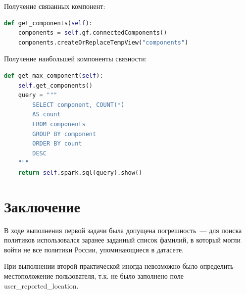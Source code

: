 Получение связанных компонент:

\begin{lstlisting}[language={Python}, caption={Получение связанных компонент}, label=lst:gf2]
def get_components(self):
	components = self.gf.connectedComponents()
	components.createOrReplaceTempView("components")
\end{lstlisting}

Получение наибольшей компоненты связности:

\begin{lstlisting}[language={Python}, caption={Получение наибольшей компоненты связанности}, label=lst:gf3]
def get_max_component(self):
	self.get_components()
	query = """
		SELECT component, COUNT(*) 
		AS count 
		FROM components
		GROUP BY component 
		ORDER BY count 
		DESC 
	"""
	return self.spark.sql(query).show()
\end{lstlisting}


\section*{Заключение}
{}

В ходе выполнения первой задачи была допущена погрешность~--- для поиска политиков использовался заранее заданный список фамилий, в который могли войти не все политики России, упоминающиеся в датасете. 

При выполнении второй практической иногда невозможно было определить местоположение пользователя, т.к. не было заполнено поле \newline user\_reported\_location.


